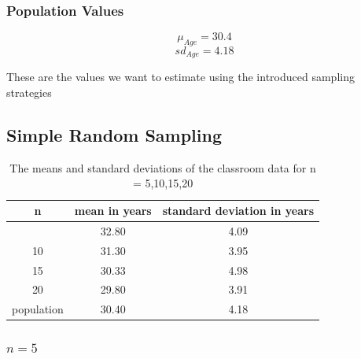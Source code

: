 \documentclass[
  a4paper,
]{scrbook}
\begin{document}
\subsubsection{Population Values}\label{population-values}

\[\mu_{Age} = 30.4\] \[sd_{Age} = 4.18\]

These are the values we want to estimate using the introduced sampling
strategies

\subsection{Simple Random Sampling}\label{simple-random-sampling}

\begingroup
\fontsize{12.0pt}{14.4pt}\selectfont

\begin{longtable}{ccc}

\caption{\label{tbl-srswor-overview}The means and standard deviations of
the classroom data for n = 5,10,15,20}

\tabularnewline

\toprule
n & mean in years & standard deviation in years \\ 
\midrule\addlinespace[2.5pt]
5 & 32.80 & 4.09 \\ 
10 & 31.30 & 3.95 \\ 
15 & 30.33 & 4.98 \\ 
20 & 29.80 & 3.91 \\ 
population & 30.40 & 4.18 \\ 
\bottomrule

\end{longtable}

\endgroup

\subsubsection{\texorpdfstring{\(n = 5\)}{n = 5}}\label{n-5}
\end{document}
